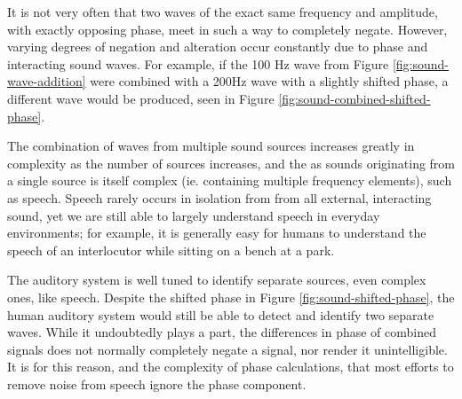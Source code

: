 It is not very often that two waves of the exact same frequency and amplitude, with exactly opposing phase, meet in such a way to completely negate.  However, varying degrees of negation and alteration occur constantly due to phase and interacting sound waves.  For example, if the 100 Hz wave from Figure \ref{fig:sound-wave-addition} were combined with a 200Hz wave with a slightly shifted phase, a different wave would be produced, seen in Figure \ref{fig:sound-combined-shifted-phase}.  

The combination of waves from multiple sound sources increases greatly in complexity as the number of sources increases, and the as sounds originating from a single source is itself complex (ie. containing multiple frequency elements), such as speech.  Speech rarely occurs in isolation from from all external, interacting sound, yet we are still able to largely understand speech in everyday environments; for example, it is generally easy for humans to understand the speech of an interlocutor while sitting on a bench at a park.

The auditory system is well tuned to identify separate sources, even complex ones, like speech. Despite the shifted phase in Figure \ref{fig:sound-shifted-phase}, the human auditory system would still be able to detect and identify two separate waves.  While it undoubtedly plays a part, the differences in phase of combined signals does not normally completely negate a signal, nor render it unintelligible.  It is for this reason, and the complexity of phase calculations, that most efforts to remove noise from speech ignore the phase component.

